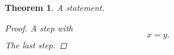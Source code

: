 \documentclass{article}
\newtheorem{theorem}{Theorem}
\begin{document}
\begin{theorem}\label{th:a}
A statement.
\begin{proof}
A step with
\begin{equation}\label{eq:a}
x = y.
\end{equation}
The last step.
\end{proof}
\end{theorem}
\end{document}
